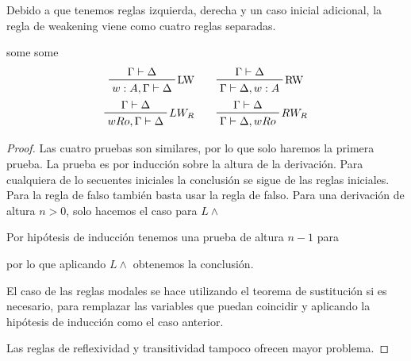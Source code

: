 Debido a que tenemos reglas izquierda, derecha y un caso inicial adicional, la regla de weakening viene como cuatro reglas separadas.

\begin{teo}
  some
  some
  \begin{align*}
    \tree{LW}{\Gamma \derives \Delta}{w:A, \Gamma \derives \Delta} \qquad & \tree{RW}{\Gamma \derives \Delta}{\Gamma \derives \Delta, w:A} \\ 
    \tree{$LW_R$}{\Gamma \derives \Delta}{wRo, \Gamma \derives \Delta} \qquad & \tree{$RW_R$}{\Gamma \derives \Delta}{\Gamma \derives \Delta, wRo} 
  \end{align*}
\end{teo}

\begin{proof}
  Las cuatro pruebas son similares, por lo que solo haremos la primera prueba.
  La prueba es por inducción sobre la altura de la derivación.
  Para cualquiera de lo secuentes iniciales la conclusión se sigue de las reglas iniciales. Para la regla de falso también basta usar la regla de falso. 
  Para una derivación de altura $n>0$, solo hacemos el caso para $L \land$


  Por hipótesis de inducción tenemos una prueba de altura $n-1$ para


  por lo que aplicando $L \land$ obtenemos la conclusión.

  El caso de las reglas modales se hace utilizando el teorema de sustitución si es necesario, para remplazar las variables que puedan coincidir y aplicando la hipótesis de inducción como el caso anterior.

  Las reglas de reflexividad y transitividad tampoco ofrecen mayor problema.
\end{proof}
